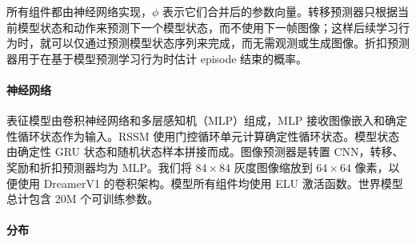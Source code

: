 
所有组件都由神经网络实现，$\phi$ 表示它们合并后的参数向量。转移预测器只根据当前模型状态和动作来预测下一个模型状态，而不使用下一帧图像；这样后续学习行为时，就可以仅通过预测模型状态序列来完成，而无需观测或生成图像。折扣预测器用于在基于模型预测学习行为时估计 episode 结束的概率。



\paragraph{神经网络}

表征模型由卷积神经网络\citep[CNN;][]{lecun1989cnn}和多层感知机（MLP）组成，MLP 接收图像嵌入和确定性循环状态作为输入。RSSM 使用门控循环单元\citep[GRU;][]{cho2014gru}计算确定性循环状态。模型状态由确定性 GRU 状态和随机状态样本拼接而成。图像预测器是转置 CNN，转移、奖励和折扣预测器均为 MLP。我们将 $84 \times 84$ 灰度图像缩放到 $64 \times 64$ 像素，以便使用 DreamerV1 的卷积架构。模型所有组件均使用 ELU 激活函数\citep{clevert2015elu}。世界模型总计包含 20M 个可训练参数。



\paragraph{分布}

